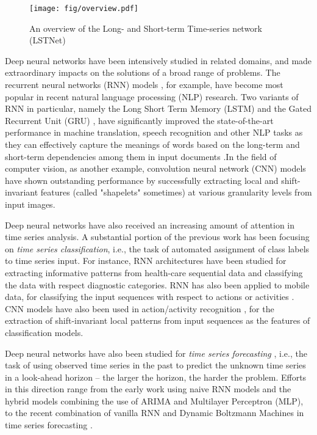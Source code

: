 \documentclass[sigconf]{acmart}
\begin{document}
    \begin{figure*}[!t]
    	\centering
        \texttt{[image: fig/overview.pdf]}
        \caption{An overview of the Long- and Short-term Time-series network (LSTNet)}
        \label{fig:overview}
	\end{figure*}   
    
    Deep neural networks have been intensively studied in related domains, and made extraordinary impacts on the solutions of a broad range of problems.  The recurrent neural networks (RNN) models \cite{elman1990finding}, for example, have become most popular in recent natural language processing (NLP) research.
Two variants of RNN in particular, namely the Long Short Term Memory (LSTM) \cite{hochreiter1997long} and the Gated Recurrent Unit (GRU) \cite{chung2014empirical}, have significantly improved the state-of-the-art performance in machine translation, speech recognition and other NLP tasks as they can effectively capture the  meanings of words based on the long-term and short-term dependencies among them in input documents  \cite{bahdanau2014neural,hinton2012deep,krizhevsky2012imagenet}.In the field of computer vision, as another example, convolution neural network (CNN) models \cite{lecun1995convolutional, krizhevsky2012imagenet} have shown outstanding performance by successfully extracting local and shift-invariant features (called "shapelets" sometimes) at various granularity levels from input images.


Deep neural networks have also received an increasing amount of attention in time series analysis. A substantial portion of the previous work has been focusing on \textit{time series classification}, i.e., the task of automated assignment of class labels to time series input. For instance, RNN architectures have been studied for extracting informative patterns from health-care sequential data \cite{lipton2015learning,che2016recurrent} and classifying the data with respect diagnostic categories.  RNN has also been applied to mobile data, for classifying the input sequences with respect to actions or activities \cite{hammerla2016deep}. CNN models have also been used in action/activity recognition \cite{lea2016temporal,yang2015deep,hammerla2016deep}, for the extraction of shift-invariant local patterns from input sequences as the features of classification models.

Deep neural networks have also been studied for \textit{time series forecasting} \cite{dasgupta2016nonlinear, yu2017deep}, i.e., the task of using observed time series in the past to predict the unknown time series in a look-ahead horizon -- the larger the horizon, the harder the problem. Efforts in this direction range from the early work using naive RNN models \cite{connor1991recurrent} and the hybrid models \cite{zhang1998forecasting,zhang2003time,jain2007hybrid} combining the use of ARIMA \cite{box1970distribution} and Multilayer Perceptron (MLP), to the recent combination of vanilla RNN and Dynamic Boltzmann Machines in time series forecasting \cite{dasgupta2016nonlinear}.
\end{document}
